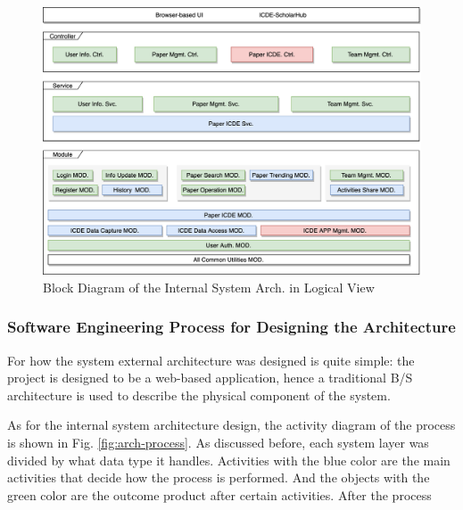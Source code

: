 \documentclass[conference]{IEEEtran}
\begin{document}
\begin{figure}[!ht]
	\centering
	\includegraphics[scale=0.082]{sys-arch.png}
	\caption{Block Diagram of the Internal System Arch\protect\footnotemark[5]\protect\footnotemark[6]. in Logical View}
	\label{fig:sys-arch}
\end{figure}


\subsubsection{\textbf{Software Engineering Process for Designing the Architecture}}
\label{sec:1.1.2}

For how the system external architecture was designed is quite simple: the project is designed to be a
web-based application, hence a traditional B/S architecture is used to describe the physical component of the system.

As for the internal system architecture design, the activity diagram of the process is shown in Fig. \ref{fig:arch-process}.
As discussed before, each system layer was divided by what data type it handles.
Activities with the blue color are the main activities that decide how the process is performed.
And the objects with the green color are the outcome product after certain activities. After the process
\end{document}
